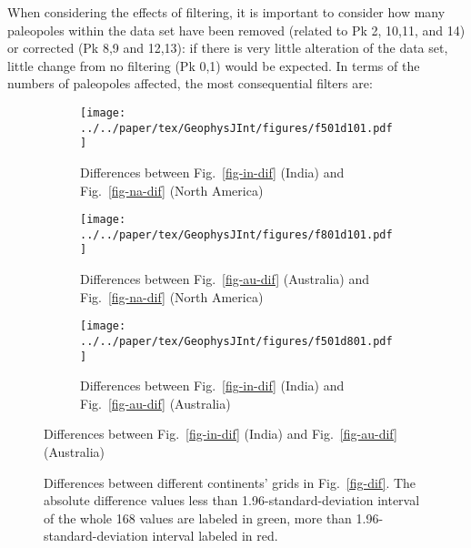 When considering the effects of filtering, it is important to consider how many
paleopoles within the data set have been removed (related to Pk 2,
10,11, and 14) or corrected (Pk 8,9 and 12,13): if there is very
little alteration of the data set, little change from no filtering (Pk 0,1)
would be expected. In terms of the numbers of paleopoles affected, the most
consequential filters are:
%
\begin{figure}[tbp]
  \centering
  \begin{subfigure}{.99\textwidth}
    \texttt{[image: ../../paper/tex/GeophysJInt/figures/f501d101.pdf]}
    \caption{Differences between Fig.~\ref{fig-in-dif} (India) and
      Fig.~\ref{fig-na-dif} (North America)}\label{fig-i-n-dif}
  \end{subfigure}
  \vspace{.1em}
  \begin{subfigure}{.99\textwidth}
    \texttt{[image: ../../paper/tex/GeophysJInt/figures/f801d101.pdf]}
    \caption{Differences between Fig.~\ref{fig-au-dif} (Australia) and
      Fig.~\ref{fig-na-dif} (North America)}\label{fig-a-n-dif}
  \end{subfigure}
  \vspace{.1em}
  \begin{subfigure}{.99\textwidth}
    \texttt{[image: ../../paper/tex/GeophysJInt/figures/f501d801.pdf]}
    \caption{Differences between Fig.~\ref{fig-in-dif} (India) and
      Fig.~\ref{fig-au-dif} (Australia)}\label{fig-i-a-dif}
  \end{subfigure}
\end{figure}
\begin{figure}[!ht]
  \ContinuedFloat\caption[Differences of $\mathcal{CPD}$ of each plate's paleomagnetic APWPs vs
    its FHM predicted APWP]{Differences between different continents' grids in
    Fig.~\ref{fig-dif}. The absolute difference values less than
    1.96-standard-deviation interval of the whole 168 values are labeled in
    green, more than 1.96-standard-deviation interval labeled in
    red.}\label{fig-d-dif}
\end{figure}
%
